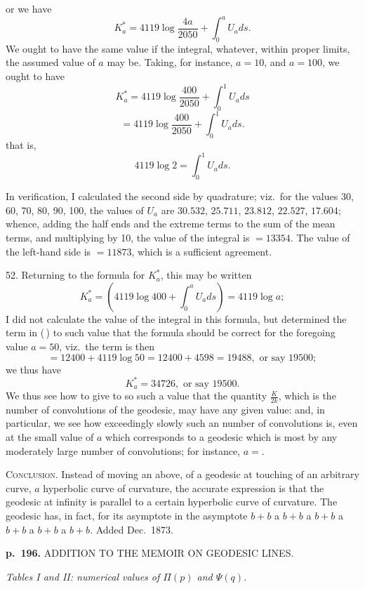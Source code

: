 \documentclass[11pt,a4paper]{book}
\begin{document}
or we have
\[
K_a^{*} = 4119 \log \frac{4a}{2050} + \int_0^{a} U_a ds.
\]
We ought to have the same value if the integral, whatever, within proper limits, the assumed value of $a$ may be.  Taking, for instance, $a = 10$, and $a = 100$, we ought to have
\[
K_a^{*} = 4119 \log \frac{400}{2050} + \int_0^{1} U_a ds
\]
\[
= 4119 \log \frac{400}{2050} + \int_0^{1} U_a ds.
\]
that is,
\[
4119 \log 2 = \int_0^{1} U_a ds.
\]

In verification, I calculated the second side by quadrature; viz.\ for the values 30, 60, 70, 80, 90, 100, the values of $U_a$ are $30.532$, $25.711$, $23.812$, $22.527$, $17.604$; whence, adding the half ends and the extreme terms to the sum of the mean terms, and multiplying by 10, the value of the integral is $= 13354$. The value of the left-hand side is $= 11873$, which is a sufficient agreement.

52. Returning to the formula for $K_a^{*}$, this may be written
\[
K_a^{*} = (4119 \log 400 + \int_0^a U_a ds) = 4119 \log a;
\]
I did not calculate the value of the integral in this formula, but determined the term in ($\,$) to such value that the formula should be correct for the foregoing value $a = 50$, viz.\ the term is then
\[
= 12400 + 4119 \log 50 = 12400 + 4598 = 19488, \text{ or say } 19500;
\]
we thus have
\[
K_a^{*} = 34726, \text{ or say } 19500.
\]
We thus see how to give to so such a value that the quantity $\frac{K}{2k}$, which is the number of convolutions of the geodesic, may have any given value: and, in particular, we see how exceedingly slowly such an number of convolutions is, even at the small value of $a$ which corresponds to a geodesic which is most by any moderately large number of convolutions; for instance, $a = $.

\textsc{Conclusion.} Instead of moving an above, of a geodesic at touching of an arbitrary curve, $a$ hyperbolic curve of curvature, the accurate expression is that the geodesic at infinity is parallel to a certain hyperbolic curve of curvature.  The geodesic has, in fact, for its asymptote in the asymptote $b + b$ a $b + b$ a $b + b$ a $b + b$ a $b + b$ a $b + b$. Added Dec.\ 1873.

\clearpage

\noindent
\textbf{p.~196.}  ADDITION TO THE MEMOIR ON GEODESIC LINES.

\begin{center}
\textit{Tables I and II: numerical values of $\Pi(p)$ and $\Psi(q)$.}
\end{center}
\end{document}
